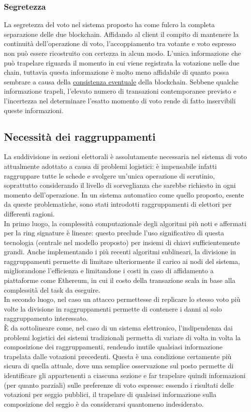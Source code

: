 		\subsubsection{Segretezza}
			La segretezza del voto nel sistema proposto ha come fulcro la completa separazione delle due blockchain. Affidando al client il compito di mantenere la continuità dell'operazione di voto, l'accoppiamento tra votante e voto espresso non può essere ricostruito con certezza in alcun modo. L'unica informazione che può trapelare riguarda il momento in cui viene registrata la votazione nelle due chain, tuttavia questa informazione è molto meno affidabile di quanto possa sembrare a causa della \href{sec:teorema_CAP}{consistenza eventuale} della blockchain. Sebbene qualche informazione trapeli, l'elevato numero di transazioni contemporanee previsto e l'incertezza nel determinare l'esatto momento di voto rende di fatto inservibili queste informazioni.
	
	
	\subsection{Necessità dei raggruppamenti}
		La suddivisione in sezioni elettorali è assolutamente necessaria nel sistema di voto attualmente adottato a causa di problemi logistici: è impensabile infatti raggruppare tutte le schede e svolgere un'unica operazione di scrutinio, soprattutto considerando il livello di sorveglianza che sarebbe richiesto in ogni momento dell'operazione. In un sistema automatico come quello proposto, esente da queste problematiche, sono stati introdotti raggruppamenti di elettori per differenti ragioni. \\
		In primo luogo, la complessità computazionale degli algoritmi più noti e affermati per la ring signature è lineare: questo preclude l'uso significativo di questa tecnologia (centrale nel modello proposto) per insiemi di chiavi sufficientemente grandi. Anche implementando i più recenti algoritmi sublineari, la divisione in raggruppamenti permette di limitare ulteriormente il carico ai nodi del sistema, migliorandone l'efficienza e limitandone i costi in caso di affidamento a piattaforme come Ethereum, in cui il costo della transazione scala in base alla complessità del task da eseguire. \\
		In secondo luogo, nel caso un attacco permettesse di replicare lo stesso voto più volte la divisione in raggruppamenti permette di contenere i danni al solo raggruppamento interessato. \\
		È da sottolineare come, nel caso di un sistema elettronico, l'indipendenza dai problemi logistici dei sistemi tradizionali permetta di variare di volta in volta la composizione dei raggruppamenti, rendendo inutile qualsiasi informazione trapelata dalle votazioni precedenti. Questa è una condizione certamente più sicura di quella attuale, dove una semplice osservazione sul posto permette di identificare gli appartenenti a ciascuna sezione e far trapelare quindi informazioni (per quanto parziali) sulle preferenze di voto espresse: essendo i risultati delle votazioni per seggio pubblici, il trapelare di qualsiasi informazione sulla composizione del seggio è da considerarsi quantomeno indesiderato.
	
